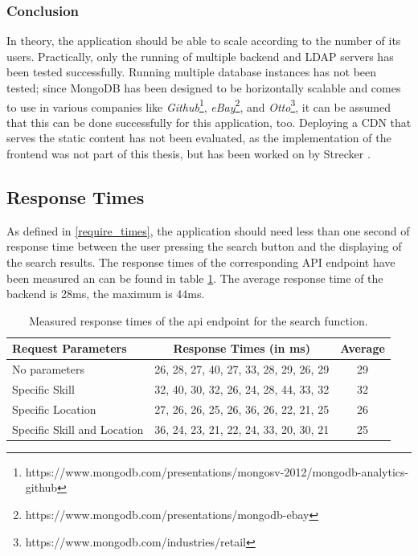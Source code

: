 \newpage

\subsubsection{Conclusion}
In theory, the application should be able to scale according to the number of its users. Practically, only the running of multiple backend and LDAP servers has been tested successfully. Running multiple database instances has not been tested; since MongoDB has been designed to be horizontally scalable and comes to use in various companies like
\textit{Github}\footnote{https://www.mongodb.com/presentations/mongosv-2012/mongodb-analytics-github},
\textit{eBay}\footnote{https://www.mongodb.com/presentations/mongodb-ebay}, and
\textit{Otto}\footnote{https://www.mongodb.com/industries/retail}, it can be assumed that this can be done successfully for this application, too.
Deploying a CDN that serves the static content has not been evaluated, as the implementation of the frontend was not part of this thesis, but has been worked on by Strecker \cite{strecker}.

\subsection{Response Times}
\label{resptime}
As defined in \ref{require_times}, the application should need less than one second of response time between the user pressing the search button and the
displaying of the search results. The response times of the corresponding API endpoint have been measured an can be found in table \ref{tab:responsetimes}.
The average response time of the backend is 28ms, the maximum is 44ms.

\begin{table}[H]
\centering
  \begin{tabular}{l|c|c|}
		Request Parameters                    & Response Times (in ms)                & Average\\
		\hline
		No parameters               & 26, 28, 27, 40, 27, 33, 28, 29, 26, 29 & 29\\
		Specific Skill              & 32, 40, 30, 32, 26, 24, 28, 44, 33, 32 & 32\\
		Specific Location           & 27, 26, 26, 25, 26, 36, 26, 22, 21, 25 & 26\\
		Specific Skill and Location & 36, 24, 23, 21, 22, 24, 33, 20, 30, 21 & 25\\
  \end{tabular}

\caption[API Response Times]{Measured response times of the api endpoint for the search function.}
\label{tab:responsetimes}
\end{table}


